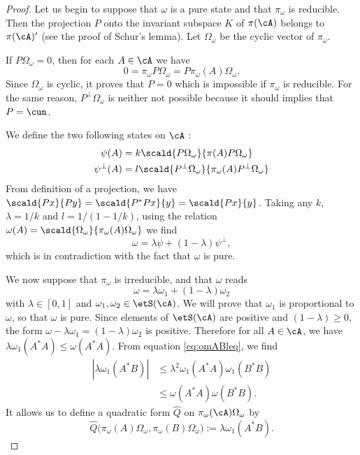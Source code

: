\begin{proof}
Let us begin to suppose that $\omega$ is a pure state and that $\pi_{\omega}$ is reducible. Then the projection $P$ onto the invariant subspace $K$ of $\pi(\cA)$ belongs to $\pi(\cA)'$ (see the proof of Schur's lemma). Let $\Omega_{\omega}$ be the cyclic vector of $\pi_{\omega}$. 

If $P\Omega_{\omega}=0$, then for each $A\in\cA$ we have
\[ 
  0=\pi_{\omega}P\Omega_{\omega}=P\pi_{\omega}(A)\Omega_{\omega}.
\]
Since $\Omega_{\omega}$ is cyclic, it proves that $P=0$ which is impossible if $\pi_{\omega}$ is reducible. For the same reason, $P^{\perp}\Omega_{\omega}$ is neither not possible because it should implies that $P=\cun$. 

We define the two following states on $\cA$ :
\begin{subequations}
\begin{align}
  \psi(A)&=k\scald{ P\Omega_{\omega} }{ \pi(A)P\Omega_{\omega} }\\
  \psi^{\perp}(A)&=l\scald{ P^{\perp}\Omega_{\omega} }{ \pi_{\omega}(A)P^{\perp}\Omega_{\omega} }
\end{align}
\end{subequations}
From definition of a projection, we have $\scald{ Px }{ Py }=\scald{ P^*Px }{ y }=\scald{ Px }{ y }$. Taking any $k$, $\lambda=1/k$ and $l=1/(1-1/k)$, using the relation $\omega(A)=\scald{ \Omega_{\omega} }{ \pi_{\omega}(A)\Omega_{\omega} }$ we find
\[ 
  \omega=\lambda\psi+(1-\lambda)\psi^{\perp},
\]
which is in contradiction with the fact that $\omega$ is pure.

We now suppose that $\pi_{\omega}$ is irreducible, and that $\omega$ reads
\[ 
  \omega=\lambda\omega_1+(1-\lambda)\omega_2
\]
with $\lambda\in[0,1]$ and $\omega_1,\omega_2\in\etS(\cA)$. We will prove that $\omega_1$ is proportional to $\omega$, so that $\omega$ is pure. Since elements of $\etS(\cA)$ are positive and $(1-\lambda)\geq0$, the form $\omega-\lambda\omega_1=(1-\lambda)\omega_2$ is positive. Therefore for all $A\in\cA$, we have $\lambda\omega_1(A^*A)\leq\omega(A^*A)$. From equation \eqref{eq:omABleq}, we find
%
\begin{equation} \label{eq_r19031}
\begin{split}
| \lambda\omega_1(A^*B) |&\leq\lambda^2\omega_1(A^*A)\omega_1(B^*B)\\
        &\leq\omega(A^*A)\omega(B^*B).
\end{split}
\end{equation}
It allows us to define a quadratic form $\hat Q$ on $\pi_{\omega}(\cA)\Omega_{\omega}$ by
\begin{equation}
\hat Q\big( \pi_{\omega}(A)\Omega_{\omega},\pi_{\omega}(B)\Omega_{\omega} \big):=\lambda\omega_1(A^*B).
\end{equation}


\end{proof}
